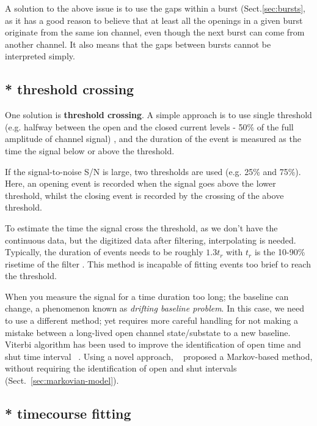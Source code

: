 A solution to the above issue is to use the gaps within a burst
(Sect.\ref{sec:bursts}, as it has a good reason to believe that at least all
the openings in a given burst originate from the same ion channel, even though
the next burst can come from another channel. It also means that the gaps
between bursts cannot be interpreted simply.


\subsection{* threshold crossing}

One solution is {\bf threshold crossing}.
A simple approach is to use single threshold (e.g. halfway between the open
and the closed current levels - 50\% of the full amplitude of channel signal)
\citep{dempster1993}, and the duration of the event is measured as the time the
signal below or above the threshold.

If the signal-to-noise S/N is large, two thresholds are used (e.g.
25\% and 75\%). Here, an opening event is recorded when the signal goes above
the lower threshold, whilst the closing event is recorded by the crossing of the
above threshold.

To estimate the time the signal cross the threshold, as we don't have the
continuous data, but the digitized data after filtering, interpolating is
needed. Typically, the duration of events needs to be roughly $1.3t_r$ with
$t_r$ is the 10-90\% risetime of the filter \citep{colquhoun1982osp}.
This method is incapable of fitting events too brief to reach the threshold.


When you measure the signal for a time duration too long; the baseline can
change, a phenomenon known as {\it drifting baseline problem}. In this case, we
need to use a different method; yet requires more careful handling for not
making a mistake between a long-lived open channel state/substate to a new
baseline. Viterbi algorithm has been used to improve the identification of open
time and shut time interval ~\citep{fredkin1992brs}.
Using a novel approach, ~\citep{venkataramanan2002ahm} proposed a Markov-based
method, without requiring the identification of open and shut intervals
(Sect.~\ref{sec:markovian-model}).

\subsection{* timecourse fitting}

